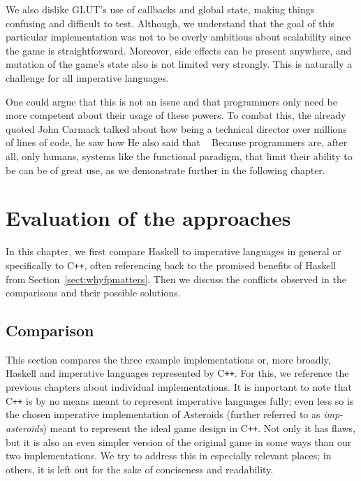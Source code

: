 \documentclass[
  digital, %
  color,   %
  table,   %
  oneside, %
  lof,     %
  lot,     %
]{fithesis3}
\newcommand{\cpp}{C\nolinebreak\texttt{+}\nolinebreak\texttt{+}}
\begin{document}
{We also dislike GLUT's use of callbacks and global state, making things
confusing and difficult to test. Although, we understand that
the goal of this particular implementation was not to be overly ambitious
about scalability since the game is straightforward.
Moreover, side effects can be present anywhere, and mutation of the game's state
also is not limited very strongly. This is naturally a challenge for all imperative languages.

One could argue that this is not an issue and that programmers only need be
more competent about their usage of these powers. To combat this, the already quoted
John Carmack talked about how being a technical director over millions of lines of code,
he saw how  \cite{carmackkeynote} He also said that
~\cite{carmackkeynote}
Because programmers are, after all, only humans, systems like the functional paradigm,
that limit their ability to be  can be of great use, as we demonstrate
further in the following chapter.




\chapter{Evaluation of the approaches}
\label{chptr:evaluation}

In this chapter, we first compare Haskell to imperative languages in general or specifically to \cpp{},
often referencing back to the promised benefits of Haskell from Section~\ref{sect:whyfpmatters}.
Then we discuss the conflicts observed in the comparisons and their possible solutions.


\section{Comparison}

This section compares the three example implementations or, more broadly, Haskell and
imperative languages represented by \cpp{}.
For this, we reference the previous chapters about individual implementations.
It is important to note that \cpp{} is by no means meant
to represent imperative languages fully; even less so is the chosen imperative implementation
of Asteroids (further referred to as \textit{imp-asteroids}) meant to represent
the ideal game design in \cpp{}. Not only it has flaws, but it is also an even
simpler version of the original game in some ways than our two implementations.
We try to address this in especially relevant places;
in others, it is left out for the sake of conciseness and readability.

}
\end{document}
